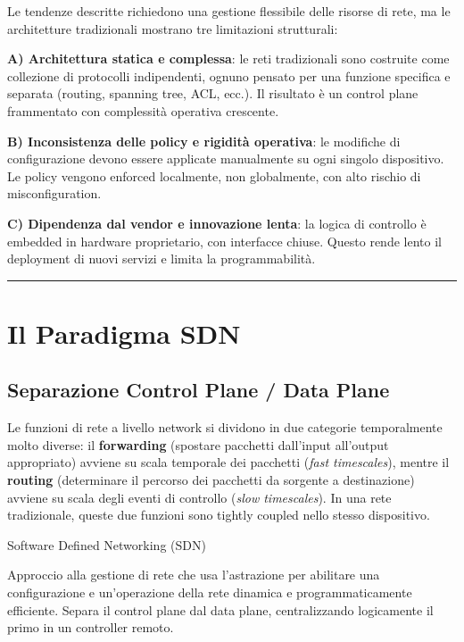 \documentclass[
  italian,
  openany]{book}
\begin{document}
Le tendenze descritte richiedono una gestione flessibile delle risorse
di rete, ma le architetture tradizionali mostrano tre limitazioni
strutturali:

\textbf{A) Architettura statica e complessa}: le reti tradizionali sono
costruite come collezione di protocolli indipendenti, ognuno pensato per
una funzione specifica e separata (routing, spanning tree, ACL, ecc.).
Il risultato è un control plane frammentato con complessità operativa
crescente.

\textbf{B) Inconsistenza delle policy e rigidità operativa}: le
modifiche di configurazione devono essere applicate manualmente su ogni
singolo dispositivo. Le policy vengono enforced localmente, non
globalmente, con alto rischio di misconfiguration.

\textbf{C) Dipendenza dal vendor e innovazione lenta}: la logica di
controllo è embedded in hardware proprietario, con interfacce chiuse.
Questo rende lento il deployment di nuovi servizi e limita la
programmabilità.

\begin{center}\rule{0.5\linewidth}{0.5pt}\end{center}

\section{Il Paradigma SDN}\label{il-paradigma-sdn}

\subsection{Separazione Control Plane / Data
Plane}\label{separazione-control-plane-data-plane}

Le funzioni di rete a livello network si dividono in due categorie
temporalmente molto diverse: il \textbf{forwarding} (spostare pacchetti
dall'input all'output appropriato) avviene su scala temporale dei
pacchetti (\emph{fast timescales}), mentre il \textbf{routing}
(determinare il percorso dei pacchetti da sorgente a destinazione)
avviene su scala degli eventi di controllo (\emph{slow timescales}). In
una rete tradizionale, queste due funzioni sono tightly coupled nello
stesso dispositivo.

\begin{calloutdefinition}{Software Defined Networking (SDN)}

Approccio alla gestione di rete che usa l'astrazione per abilitare una
configurazione e un'operazione della rete dinamica e programmaticamente
efficiente. Separa il control plane dal data plane, centralizzando
logicamente il primo in un controller remoto.

\end{calloutdefinition}
\end{document}
